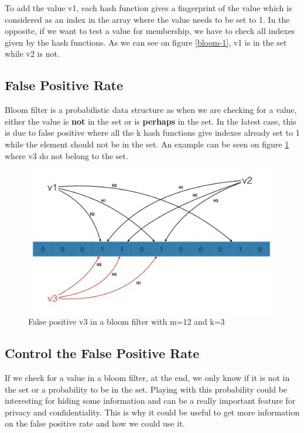 \documentclass{eplmastersthesis}
\begin{document}
To add the value v1, each hash function gives a fingerprint of the value which is considered as an index in the array where the value needs to be set to 1. In the opposite, if we want to test a value for membership, we have to check all indexes given by the hash functions. As we can see on figure \ref{bloom-1}, v1 is in the set while v2 is not.

\subsection{False Positive Rate}

Bloom filter is a probabilistic data structure as when we are checking for a value, either the value is \textbf{not} in the set or is \textbf{perhaps} in the set. 
In the latest case, this is due to false positive where all the k hash functions give indexes already set to 1 while the element should not be in the set.
An example can be seen on figure \ref{bloom-2} where v3 do not belong to the set.

\begin{figure}[h!]
	\begin{center}
		\includegraphics[scale=0.3]{res/bloom-2}
		\caption{False positive v3 in a bloom filter with m=12 and k=3}
		\label{bloom-2}
	\end{center}
\end{figure}

\subsection{Control the False Positive Rate}
If we check for a value in a bloom filter, at the end, we only know if it is not in the set or a probability to be in the set. Playing with this probability could be interesting for hiding some information and can be a really important feature for privacy and confidentiality.
This is why it could be useful to get more information on the false positive rate and how we could use it.\\
\end{document}
